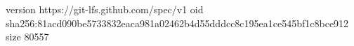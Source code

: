 version https://git-lfs.github.com/spec/v1
oid sha256:81acd090be5733832eaca981a02462b4d55dddcc8c195ea1ce545bf1c8bce912
size 80557
